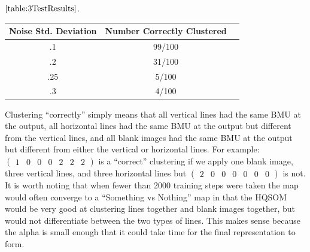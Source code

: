 \documentclass[a4paper,10pt]{article}
\begin{document}
$\ref{table:3TestResults}$.
\begin{center}
  \begin{tabular}{ | c | c | c | }
    \hline
    Noise Std. Deviation & Number Correctly Clustered\\ \hline
    .1 & 99/100 \\ \hline
    .2 & 31/100 \\ \hline
    .25 & 5/100 \\ \hline
    .3 &  4/100\\
    \hline
  \end{tabular}
\label{table:3TestResults}
\end{center}
Clustering ``correctly'' simply means that all vertical lines had the same BMU at the output, all
horizontal lines had the same BMU at the output but different from the vertical lines, and all
blank images had the same BMU at the output but different from either the vertical or horizontal
lines.  For example: $ \begin{pmatrix} 1 & 0 & 0 & 0 & 2 & 2 & 2 \end{pmatrix}$ is a ``correct''
clustering if we apply one blank image, three vertical lines, and three horizontal lines but $
\begin{pmatrix}  2 & 0 & 0 & 0 & 0 & 0 & 0 \end{pmatrix}$ is not. It is worth noting that when fewer
than 2000 training steps were taken the map would often converge to a ``Something vs Nothing'' map
in that the HQSOM would be very good at clustering lines together and blank images together, but
would not differentiate between the two types of lines.  This makes sense because the alpha is
small enough that it could take time for the final representation to form.
\end{document}
